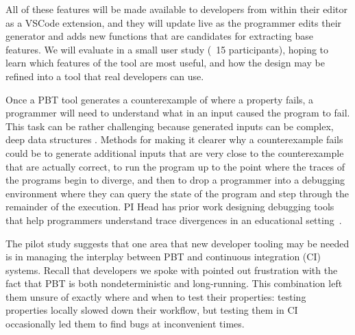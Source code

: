 All of these features will be made available to developers from within their
editor as a VSCode extension, and they will update live as the programmer edits
their generator and adds new functions that are candidates for extracting base
features. We will evaluate \genvis{} in a small user study (~15 participants),
hoping to learn which features of the tool are most useful, and how the design
may be refined into a tool that real developers can use. 



Once a PBT tool generates a counterexample of where a property fails, a
programmer will need to understand what in an input caused the program to fail.
This task can be rather challenging because generated inputs can be complex,
deep data structures . Methods for making it clearer why a counterexample
fails could be to generate additional inputs that are very close to the
counterexample that are actually correct, to run the program up to the point
where the traces of the programs begin to diverge, and then to drop a programmer
into a debugging environment where they can query the state of the program and
step through the remainder of the execution. PI Head has prior work designing
debugging tools that help programmers understand trace divergences in an
educational setting~\cite{suzuki2017tracediff}.   


The pilot study suggests that one area that new developer tooling may be
needed is in managing the interplay between PBT and continuous integration (CI)
systems. Recall that developers we spoke with pointed out frustration with the
fact that PBT is both nondeterministic and long-running. This combination left
them unsure of exactly where and when to test their properties: testing
properties locally slowed down their workflow, but testing them in CI
occasionally led them to find bugs at inconvenient times.

